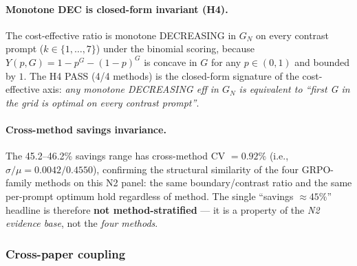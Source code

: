 \paragraph{Monotone DEC is closed-form invariant (H4).}

The cost-effective ratio is monotone DECREASING in $G_N$ on every
contrast prompt ($k \in \{1, \ldots, 7\}$) under the binomial scoring,
because $Y(p, G) = 1 - p^G - (1-p)^G$ is concave in $G$ for any
$p \in (0, 1)$ and bounded by $1$. The H4 PASS (4/4 methods) is the
closed-form signature of the cost-effective axis: \emph{any monotone
DECREASING eff in $G_N$ is equivalent to ``first G in the grid is
optimal on every contrast prompt''}.

\paragraph{Cross-method savings invariance.}

The 45.2--46.2\% savings range has cross-method CV $= 0.92\%$ (i.e.,
$\sigma / \mu = 0.0042 / 0.4550$), confirming the structural
similarity of the four GRPO-family methods on this N2 panel: the same
boundary/contrast ratio and the same per-prompt optimum hold regardless
of method. The single ``savings $\approx 45\%$'' headline is therefore
\textbf{not method-stratified} --- it is a property of the \emph{N2
evidence base}, not the \emph{four methods}.

\subsubsection*{Cross-paper coupling}

